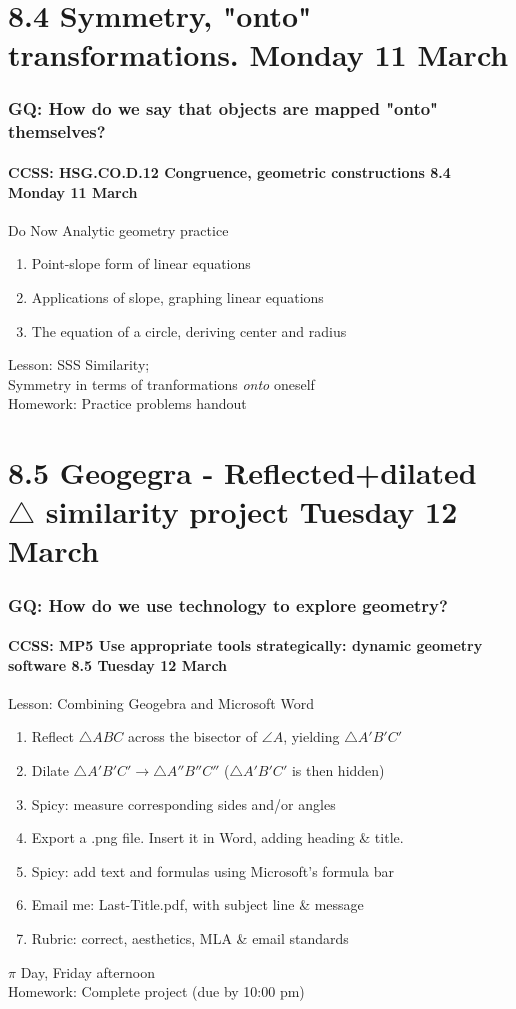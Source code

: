 \documentclass{beamer}
\begin{document}
\section{8.4 Symmetry, "onto" transformations. Monday 11 March}
  \frame
  {
    \frametitle{GQ: How do we say that objects are mapped "onto" themselves?}
    \framesubtitle{CCSS: HSG.CO.D.12 Congruence, geometric constructions \hfill \alert{8.4 Monday 11 March}}

    \begin{block}{Do Now Analytic geometry practice}
      \begin{enumerate}
        \item Point-slope form of linear equations
        \item Applications of slope, graphing linear equations
        \item The equation of a circle, deriving center and radius
      \end{enumerate}
    \end{block}
    Lesson: SSS Similarity;
    \\Symmetry in terms of tranformations \emph{onto} oneself\\[0.5cm]
    Homework: Practice problems handout
  }

\section{8.5 Geogegra - Reflected+dilated $\triangle$ similarity project Tuesday 12 March}
  \frame
  {
    \frametitle{GQ: How do we use technology to explore geometry?}
    \framesubtitle{CCSS: MP5 Use appropriate tools strategically: dynamic geometry software \hfill \alert{8.5 Tuesday 12 March}}

    \begin{block}{Lesson: Combining Geogebra and Microsoft Word}
      \begin{enumerate}
        \item Reflect $\triangle ABC$ across the bisector of $\angle A$, yielding $\triangle A'B'C'$
        \item Dilate $\triangle A'B'C' \rightarrow \triangle A''B''C''$ ($\triangle A'B'C'$ is then hidden)
        \item Spicy: measure corresponding sides and/or angles
        \item Export a .png file. Insert it in Word, adding heading \& title.
        \item Spicy: add text and formulas using Microsoft's formula bar
        \item Email me: Last-Title.pdf, with subject line \& message
        \item Rubric: correct, aesthetics, MLA \& email standards
      \end{enumerate}
    \end{block}
    \alert{$\pi$ Day, Friday afternoon}\\
    Homework: Complete project (due by 10:00 pm)
  }
\end{document}
